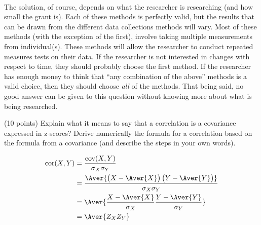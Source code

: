 \documentclass[onecolumn,10pt]{jhwhw}
\begin{document}
\\
The solution, of course, depends on what the researcher is researching (and how small the grant is). Each of these methods is perfectly valid, but the results that can be drawn from the different data collections methods will vary. Most of these methods (with the exception of the first), involve taking multiple measurements from individual(s). These methods will allow the researcher to conduct repeated measures tests on their data. If the researcher is not interested in changes with respect to time, they should probably choose the first method. If the researcher has enough money to think that ``any combination of the above'' methods is a valid choice, then they should choose \textit{all} of the methods. That being said, no good answer can be given to this question without knowing more about what is being researched.

\clearpage
{}

(10 points) Explain what it means to say that a correlation is a covariance expressed in z-scores? Derive numerically the formula for a correlation based on the formula from a covariance (and describe the steps in your own words).

\begin{align*}
\mbox{cor}(X, Y) &= \frac{\mbox{cov}(X, Y)}{\sigma_X \sigma_Y} \\
                 &= \frac{\Aver{\left(X - \Aver{X} \right) \left(Y - \Aver{Y} \right) }}{\sigma_X \sigma_Y} \\
                 &= \Aver{\frac{X - \Aver{X}}{\sigma_X} \frac{Y - \Aver{Y}}{\sigma_Y}} \\
                 &= \Aver{Z_X Z_Y}
\end{align*}
\end{document}
